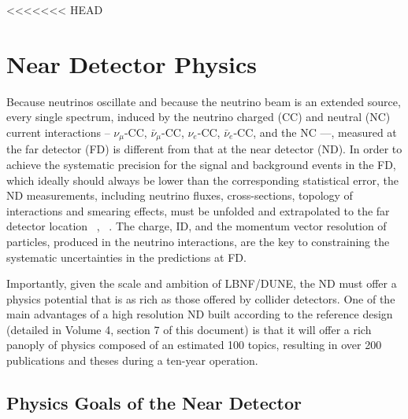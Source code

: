 <<<<<<< HEAD


\chapter{Near Detector Physics}
\label{ch:physics-nd}

Because neutrinos oscillate and because the neutrino beam is an extended  source, every single 
spectrum,  induced by the neutrino charged (CC) and neutral (NC) current interactions -- $\nu_\mu$-CC, 
$\bar \nu_\mu$-CC, $\nu_e$-CC, $\bar \nu_e$-CC, and the NC ---, measured at the far detector (FD)  is different from that at the near 
detector (ND). 
In order to achieve the systematic precision for the signal and background events  in the FD,  
which ideally should always be lower than the corresponding statistical error, the ND 
measurements,  including neutrino fluxes,  cross-sections, topology of 
interactions and smearing effects, must be unfolded and extrapolated to the far detector location 
~\cite{ND-REQ1}, ~\cite{ND-REQ2}.  The charge, ID,  and the momentum vector resolution of 
particles, produced in the neutrino interactions,  are the key to constraining  the systematic 
uncertainties in the predictions at FD. 


Importantly, given the scale and ambition of LBNF/DUNE, the ND must offer a physics 
potential that is as rich as those offered by collider detectors. 
One of the main advantages of a high resolution ND built according to the reference design 
(detailed in Volume 4, section 7 of  this document) is that it will offer a rich panoply of physics composed 
of an estimated 100 topics,  resulting in over 200 publications and  theses during a ten-year operation. 


\section{Physics Goals of the Near Detector}
\label{sec:physics-nd-goals}

